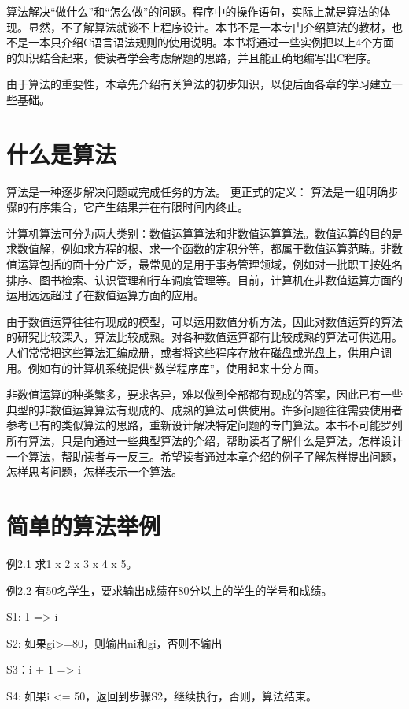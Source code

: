 算法解决“做什么”和“怎么做”的问题。程序中的操作语句，实际上就是算法的体现。显然，不了解算法就谈不上程序设计。本书不是一本专门介绍算法的教材，也不是一本只介绍C语言语法规则的使用说明。本书将通过一些实例把以上4个方面的知识结合起来，使读者学会考虑解题的思路，并且能正确地编写出C程序。

由于算法的重要性，本章先介绍有关算法的初步知识，以便后面各章的学习建立一些基础。

\section{什么是算法}

算法是一种逐步解决问题或完成任务的方法。
更正式的定义：
算法是一组明确步骤的有序集合，它产生结果并在有限时间内终止。

计算机算法可分为两大类别：数值运算算法和非数值运算算法。数值运算的目的是求数值解，例如求方程的根、求一个函数的定积分等，都属于数值运算范畴。非数值运算包括的面十分广泛，最常见的是用于事务管理领域，例如对一批职工按姓名排序、图书检索、认识管理和行车调度管理等。目前，计算机在非数值运算方面的运用远远超过了在数值运算方面的应用。

由于数值运算往往有现成的模型，可以运用数值分析方法，因此对数值运算的算法的研究比较深入，算法比较成熟。对各种数值运算都有比较成熟的算法可供选用。人们常常把这些算法汇编成册，或者将这些程序存放在磁盘或光盘上，供用户调用。例如有的计算机系统提供“数学程序库”，使用起来十分方面。

非数值运算的种类繁多，要求各异，难以做到全部都有现成的答案，因此已有一些典型的非数值运算算法有现成的、成熟的算法可供使用。许多问题往往需要使用者参考已有的类似算法的思路，重新设计解决特定问题的专门算法。本书不可能罗列所有算法，只是向通过一些典型算法的介绍，帮助读者了解什么是算法，怎样设计一个算法，帮助读者与一反三。希望读者通过本章介绍的例子了解怎样提出问题，怎样思考问题，怎样表示一个算法。

\section{简单的算法举例}

例2.1 求1 x 2 x 3 x 4 x 5。

例2.2 有50名学生，要求输出成绩在80分以上的学生的学号和成绩。

S1: 1 => i

S2: 如果gi>=80，则输出ni和gi，否则不输出

S3：i + 1 => i

S4: 如果i <= 50，返回到步骤S2，继续执行，否则，算法结束。

